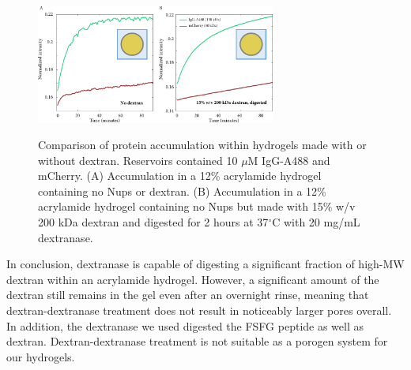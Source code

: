 \begin{figure}
\caption{Comparison of protein accumulation within hydrogels made with or without dextran.  Reservoirs contained 10 $\mu$M IgG-A488 and mCherry. (A) Accumulation in a 12\% acrylamide hydrogel containing no Nups or dextran. (B) Accumulation in a 12\% acrylamide hydrogel containing no Nups but made with 15\% w/v 200 kDa dextran and digested for 2 hours at 37$^\circ$C with 20 mg/mL dextranase.}
\centering
\includegraphics[width=0.7\textwidth]{figs/ch03/dxase-results}
\label{fig:dxase-results}
\end{figure} %

In conclusion, dextranase is capable of digesting a significant fraction of high-MW dextran within an acrylamide hydrogel.  However, a significant amount of the dextran still remains in the gel even after an overnight rinse, meaning that dextran-dextranase treatment does not result in noticeably larger pores overall.  In addition, the dextranase we used digested the FSFG peptide as well as dextran.  Dextran-dextranase treatment is not suitable as a porogen system for our hydrogels.

